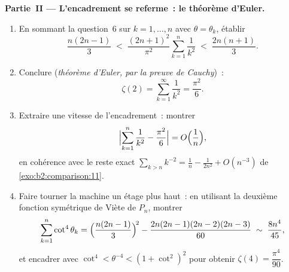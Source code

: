 \begin{problem}[{Problème du week-end --- $\zeta(2) = \pi^2/6$ et le
panorama de Bertrand}]
\medskip
\noindent\textbf{Partie~II --- L'encadrement se referme~: le théorème
d'Euler.}
\begin{enumerate}[resume]
  \item En sommant la question~6 sur $k = 1, \dots, n$ avec $\theta =
        \theta_k$, établir
        \[
        \frac{n(2n-1)}{3} \;<\;
        \frac{(2n+1)^2}{\pi^2}\sum_{k=1}^{n}\frac1{k^2}
        \;<\; \frac{2n(n+1)}{3}.
        \]
  \item Conclure (\emph{théorème d'Euler, par la preuve de
        Cauchy})~:
        \[
        \zeta(2) = \sum_{k=1}^{\infty}\frac{1}{k^2} =
        \frac{\pi^2}{6}.
        \]
  \item Extraire une vitesse de l'encadrement~: montrer
        \[
        \Bigl|\sum_{k=1}^{n}\frac1{k^2} - \frac{\pi^2}6\Bigr|
        = O\Bigl(\frac1n\Bigr),
        \]
        en cohérence avec le reste exact $\sum_{k>n}k^{-2} =
        \frac1n - \frac{1}{2n^2} + O(n^{-3})$ de
        \cref{exo:b2:comparison:11}.
  \item Faire tourner la machine un étage plus haut~: en utilisant la
        deuxième fonction symétrique de Viète de $P_n$, montrer
        \[
        \sum_{k=1}^{n}\cot^4\theta_k =
        \Bigl(\frac{n(2n-1)}3\Bigr)^{\!2} -
        \frac{2n(2n-1)(2n-2)(2n-3)}{60}
        \;\sim\; \frac{8n^4}{45},
        \]
        et encadrer avec $\cot^4 < \theta^{-4} < (1 +
        \cot^2)^2$ pour obtenir $\zeta(4) = \dfrac{\pi^4}{90}$.
\end{enumerate}


\end{problem}
